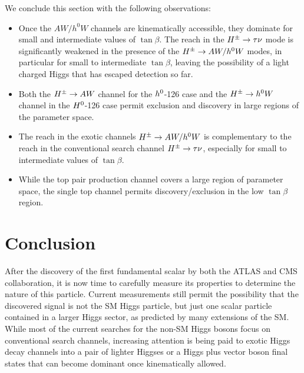  We conclude this section with the following observations:  
\begin{itemize}
\item Once the $AW/h^0W$ channels are kinematically accessible, they dominate for small and intermediate values of $\tan\beta$. The reach in the $H^{\pm} \to \tau\nu$ mode is significantly weakened in the presence of the $H^{\pm} \to AW/h^0W$ modes, in particular for small  to intermediate $\tan\beta$, leaving the possibility of a light charged Higgs that has escaped detection so far.
\item Both the $H^{\pm} \to A W$ channel for the $h^0$-126 case and the $H^{\pm} \to h^0 W$ channel in the $H^0$-126 case permit exclusion and discovery in large regions of the parameter space.
\item The reach in the exotic channels  $H^{\pm} \rightarrow A W/h^0 W$ is complementary to the reach in the conventional search channel  $H^{\pm} \to \tau\nu$,  especially for small to intermediate values of $\tan\beta$.   
\item While the top pair production channel covers a large  region of parameter space, the single top channel permits discovery/exclusion  in the  low $\tan\beta$ region.      
\end{itemize} 

\section{Conclusion}
\label{sec:conclusion}

After the discovery of the first fundamental scalar by both the ATLAS and CMS collaboration, it is now time to carefully measure its properties to determine the nature of this particle. Current measurements still permit the possibility that the discovered signal is not the SM Higgs particle, but just one scalar particle contained in a larger Higgs sector, as predicted by many  extensions of the SM. While most of the current searches for the non-SM  Higgs bosons focus on conventional search channels,  increasing attention is being paid to exotic Higgs decay channels \cite{Curtin:2013fra, Brownson:2013lka, Coleppa:2014hxa, Coleppa:2014cca,Li:2015lra,Dorsch:2014qja,Chen:2013emb,Chen:2014dma,Enberg:2014pua,CMS:2014yra,Aad:2015wra,CMS:2013eua}  into a pair of lighter Higgses or a Higgs plus vector boson final states that can become dominant once kinematically allowed. 

